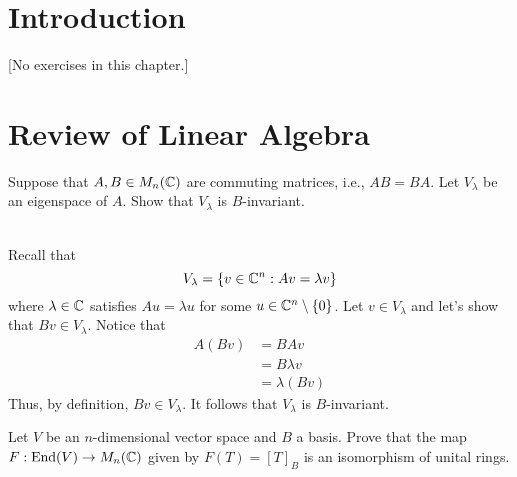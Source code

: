 \chapter{Introduction}

[No exercises in this chapter.]

\chapter{Review of Linear Algebra}

\begin{exercise}
    Suppose that $A, B \in M_n(\mathbb{C})$ are commuting matrices, i.e., $AB =BA$. Let $V_{\lambda}$ be an eigenspace of $A$. Show that $V_{\lambda}$ is $B$-invariant. \\
\end{exercise}

\begin{solution}
    \\ Recall that
    $$V_{\lambda} = \{v \in \mathbb{C}^n : Av = \lambda v\}$$
    where $\lambda \in \mathbb{C}$ satisfies $Au = \lambda u$ for some $u \in \mathbb{C}^n \setminus \{0\}$. Let $v \in V_{\lambda}$ and let's show that $Bv \in V_{\lambda}$. Notice that
    \begin{align*}
        A(Bv) &= BAv \\
        &= B\lambda v \\
        &= \lambda (Bv)
    \end{align*}
    Thus, by definition, $Bv \in V_{\lambda}$. It follows that $V_{\lambda}$ is $B$-invariant. \\
\end{solution}

\begin{exercise}
    Let $V$ be an $n$-dimensional vector space and $B$ a basis. Prove that the map $F: \text{End}(V) \to M_{n}(\mathbb{C})$ given by $F(T) = [T]_B$ is an isomorphism of unital rings. \\
\end{exercise}

